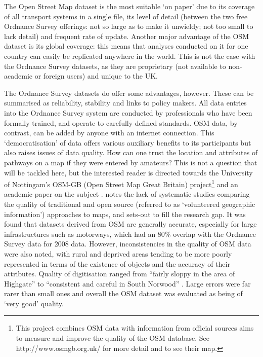 \documentclass[a4paper, 11pt, twoside]{Thesis}
\begin{document}
The Open Street Map dataset is the most suitable `on paper' due to its coverage
of all transport systems in a single file, its level of detail (between the two
free Ordnance Survey offerings: not so large as to make it unwieldy; not too
small to lack detail) and frequent rate of update. Another major advantage of
the OSM dataset is its global coverage: this means that analyses conducted on
it for one country can easily be replicated anywhere in the world. This is not
the case with the Ordnance Survey datasets, as they are proprietary (not
available to non-academic or foreign users) and unique to the UK.

The Ordnance Survey datasets do offer some advantages, however. These can be
summarised as reliability, stability and links to policy makers. All data
entries into the Ordnance Survey system are conducted by professionals who have
been formally trained, and operate to carefully defined standards. OSM data, by
contrast, can be added by anyone with an internet connection. This
`democratisation' of data offers various auxiliary benefits to its participants
\citep{Foresman2008} but also raises issues of data quality. How can one trust
the location and attributes of pathways on a map if they were entered by
amateurs? This is not a question that will be tackled here, but the interested
reader is directed towards the University of Nottingam's OSM-GB (Open Street
Map Great Britain) project\footnote{This project combines OSM data with
information from official sources aims to measure and improve the
quality of the OSM database. See http://www.osmgb.org.uk/ for more detail and
to see their map.} and an academic paper on the subject \citep{Haklay2010}.
\citet{Haklay2010} notes the lack of systematic studies comparing the quality
of traditional and open source (referred to as `volunteered geographic
information') approaches to maps, and sets-out to fill the research gap. It
was found that datasets derived from OSM are generally accurate, especially for large
infrastructures such as motorways, which had an 80\% overlap with the Ordnance
Survey data for 2008 data. However, inconsistencies in the quality of OSM data
were also noted, with rural and deprived areas tending to be more poorly represented in
terms of the existence of objects and the accuracy of their attributes.
Quality of digitisation ranged from ``fairly sloppy in the area of Highgate''
to ``consistent and careful in South Norwood'' \citep[p.~699]{Haklay2010}.
Large errors were far rarer than small ones and overall the OSM
dataset was evaluated as being of `very good' quality.
\end{document}
